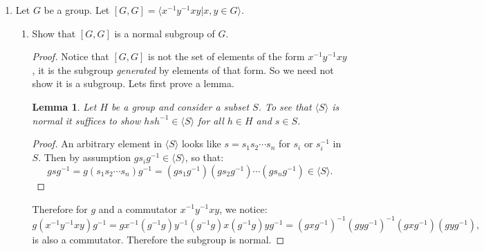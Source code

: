 \documentclass[11pt]{article}
\newtheorem{lemma}{Lemma}
\newcommand{\la}{\langle}
\newcommand{\ra}{\rangle}
\begin{document}
\begin{enumerate}
\begin{enumerate}
\begin{proof}
      Let $K$ be the kernel of the action, and suppose that $g\in G$ acts trivially on $A$.  In particular, this means that $g\cdot H = gH = H$, so that $g\in H$.  This shows that $K\le H$.  Since $H$ has order 2, this means $K = 1$ or $K=H$.  But $K$ is normal, and by part (b), $H$ is not normal, so the only possibility is that $K=1$, which was our goal.
    \end{proof}
    \item Complete the classification of all groups of order 6 by showing that if $Z$ is an abelian group of order 6 then $Z\cong Z_6$.  (\textit{Hint:} We do have Cauchy's theorem for abelian groups.)  \textit{We've now classified groups of order $\le7$.}
    \begin{proof}
      By Cauchy's theorem, there are $x,y\in Z$ of order 2 and 3 respectively.  We will show that $|xy|=6$, which gives the result.  By Lagrange's theorem, we know $\langle x\rangle\cap\langle y\rangle = 1$.  Notice that if $x^iy^j=1$, then $x^i=y^{-j}$, so that $y^{-j}\in\langle x\rangle$ and so it must be 1, and so $x^i=1$ as well.  In particular, if $(xy)^n = x^ny^n=1$, then $x^n=y^n=1$.  By HW2\#8(c), this means $2|n$ and $3|n$, so that $6|n$.  Therefore $|xy|=6$ as desired.
    \end{proof}
  \end{enumerate}
  \item Let $G$ be a group.  Let $[G,G] = \la x^{-1}y^{-1}xy | x,y\in G\ra$.
  \begin{enumerate}
    \item Show that $[G,G]$ is a normal subgroup of $G$.
    \begin{proof}
      Notice that $[G,G]$ is not the set of elements of the form $x^{-1}y^{-1}xy$, it is the subgroup \textit{generated} by elements of that form.  So we need not show it is a subgroup.  Lets first prove a lemma.
      \begin{lemma}
        Let $H$ be a group and consider a subset $S$.  To see that $\la S\ra$ is normal it suffices to show $hsh^{-1}\in\la S\ra$ for all $h\in H$ and $s\in S$.
      \end{lemma}
      \begin{proof}
        An arbitrary element in $\la S\ra$ looks like $s = s_1s_2\cdots s_n$ for $s_i$ or $s_i^{-1}$ in $S$.  Then by assumption $g s_i g^{-1}\in\la S\ra$, so that:
        \[gsg^{-1} = g(s_1s_2\cdots s_n)g^{-1} = (gs_1g^{-1})(gs_2g^{-1})\cdots (gs_ng^{-1})\in\la S\ra.\]
      \end{proof}
      Therefore for $g$ and a commutator $x^{-1}y^{-1}xy$, we notice:
      \[g(x^{-1}y^{-1}xy)g^{-1} = gx^{-1}(g^{-1}g)y^{-1}(g^{-1}g)x(g^{-1}g)yg^{-1} = (gxg^{-1})^{-1}(gyg^{-1})^{-1}(gxg^{-1})(gyg^{-1}),\]
      is also a commutator.  Therefore the subgroup is normal.


\end{proof}
\end{enumerate}
\end{enumerate}
\end{document}
